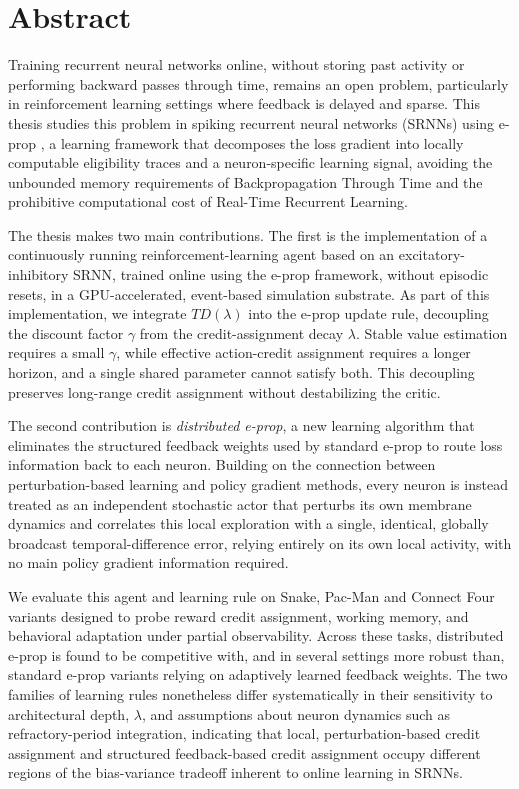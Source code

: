 \documentclass[11pt]{report}
\begin{document}


\chapter*{Abstract}

Training recurrent neural networks online, without storing past activity or
performing backward passes through time, remains an open problem,
particularly in reinforcement learning settings where feedback is delayed and 
sparse. This thesis studies this
problem in spiking recurrent neural networks (SRNNs) using e-prop
\citep{eprop2020}, a learning framework that decomposes the loss gradient
into locally computable eligibility traces and a neuron-specific learning
signal, avoiding the unbounded memory requirements of Backpropagation
Through Time and the prohibitive computational cost of Real-Time Recurrent
Learning.

The thesis makes two main contributions. The first is the implementation
of a continuously running reinforcement-learning agent based on an
excitatory-inhibitory SRNN, trained online using the e-prop
framework, without episodic resets, in a GPU-accelerated, event-based
simulation substrate. As part of this implementation, we integrate
$TD(\lambda)$ into the e-prop update rule, decoupling the discount factor
$\gamma$ from the credit-assignment decay $\lambda$. Stable value
estimation requires a small $\gamma$, while effective action-credit
assignment requires a longer horizon, and a single shared parameter cannot
satisfy both. This decoupling preserves long-range credit assignment
without destabilizing the critic.

The second contribution is \emph{distributed e-prop}, a new
learning algorithm that eliminates the structured feedback weights used by
standard e-prop to route loss information back to each neuron. Building on
the connection between perturbation-based learning and policy gradient
methods, every neuron is instead treated as an independent stochastic
actor that perturbs its own membrane dynamics and correlates this local
exploration with a single, identical, globally broadcast
temporal-difference error, relying entirely on its own local activity,
with no main policy gradient information required.

We evaluate this agent and learning rule on Snake, Pac-Man and Connect Four 
variants designed to probe reward credit assignment,
working memory, and behavioral adaptation under partial observability.
Across these tasks, distributed e-prop is found to be competitive with,
and in several settings more robust than, standard e-prop variants relying on  
adaptively learned feedback weights. The two
families of learning rules nonetheless differ systematically in their
sensitivity to architectural depth, $\lambda$,
and assumptions about neuron dynamics such as refractory-period
integration, indicating that local, perturbation-based credit assignment
and structured feedback-based credit assignment occupy different regions of the bias-variance tradeoff inherent to
online learning in SRNNs.
\end{document}
